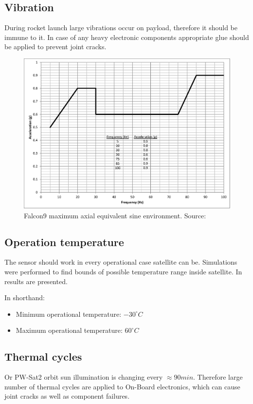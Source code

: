 \subsection{Vibration}
	During rocket launch large vibrations occur on payload, therefore it should be immune to it. In case of any heavy electronic components appropriate glue should be applied to prevent joint cracks.
	\begin{figure}[H]
		\centering
		\includegraphics[width=0.5\paperwidth]{img/Falcon9_vibration.eps}
		\caption{Falcon9 maximum axial equivalent sine environment. Source: \cite{Falcon9_user_manual}}
		\label{Falcon9_vibration}
	\end{figure}	


\subsection{Operation temperature}
	The sensor should work in every operational case satellite can be. Simulations were performed to find bounds of possible temperature range inside satellite.	In \cite{PWSAT_TCS_CDR} results are presented. 
	
	In shorthand:
	\begin{itemize}
		\item Minimum operational temperature: $-30^\circ C$
		\item Maximum operational temperature: $60^\circ C$
	\end{itemize}


\subsection{Thermal cycles}
	Or PW-Sat2 orbit sun illumination is changing every $\approx 90min$. Therefore large number of thermal cycles are applied to On-Board electronics, which can cause joint cracks as well as component failures. 
	
